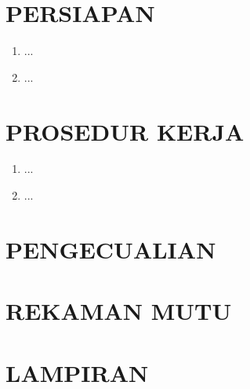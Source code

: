 \documentclass[12pt]{sop}
\begin{document}
    \section{PERSIAPAN}
    \begin{enumerate}
        \item ...
        \item ...
    \end{enumerate}

    \section{PROSEDUR KERJA}
    \begin{enumerate}
        \item ...
        \item ...
    \end{enumerate}

    \section{PENGECUALIAN}
    \section{REKAMAN MUTU}
    \section{LAMPIRAN}
\end{document}
